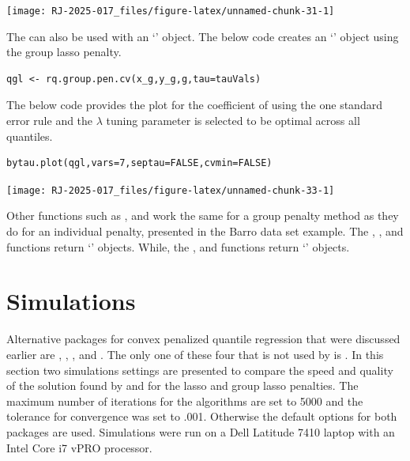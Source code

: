 \begin{center}\texttt{[image: RJ-2025-017\_files/figure-latex/unnamed-chunk-31-1]} \end{center}

The  can also be used with an `' object. The below code creates an `' object using the group lasso penalty.

\begin{verbatim}
qgl <- rq.group.pen.cv(x_g,y_g,g,tau=tauVals)
\end{verbatim}

The below code provides the plot for the coefficient of  using the one standard error rule and the \(\lambda\) tuning parameter is selected to be optimal across all quantiles.

\begin{verbatim}
bytau.plot(qgl,vars=7,septau=FALSE,cvmin=FALSE)
\end{verbatim}

\begin{center}\texttt{[image: RJ-2025-017\_files/figure-latex/unnamed-chunk-33-1]} \end{center}

Other functions such as ,  and  work the same for a group penalty method as they do for an individual penalty, presented in the Barro data set example. The , , and  functions return `' objects. While, the ,  and  functions return `' objects.

\section{Simulations}\label{simulations}

Alternative packages for convex penalized quantile regression that were discussed earlier are , , , and . The only one of these four that is not used by  is . In this section two simulations settings are presented to compare the speed and quality of the solution found by  and  for the lasso and group lasso penalties. The maximum number of iterations for the algorithms are set to 5000 and the tolerance for convergence was set to .001. Otherwise the default options for both packages are used. Simulations were run on a Dell Latitude 7410 laptop with an Intel Core i7 vPRO processor.


